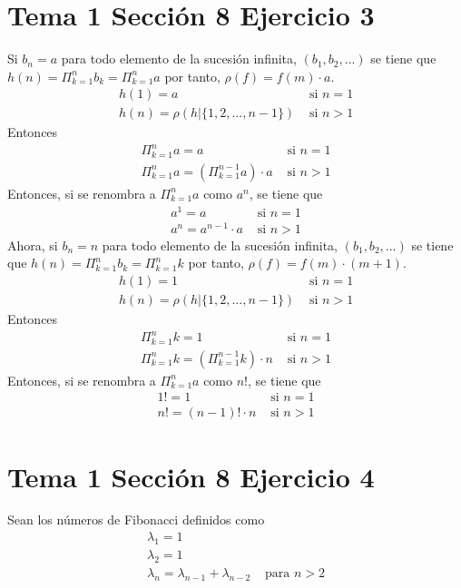 \documentclass{article}
\begin{document}
\section{Tema 1 Sección 8 Ejercicio 3}
Si $b_n=a$ para todo elemento de la sucesión infinita, $(b_1,b_2,...)$ se tiene que $h(n)=\Pi^n_{k=1}b_k=\Pi^n_{k=1}a$ por tanto, $\rho(f)= f(m)\cdot a$. 
\begin{eqnarray}
h(1)=a & \text{ si }n=1 \nonumber\\
h(n)=\rho(h|\{1,2,...,n-1\}) & \text{ si }n>1 \nonumber
\end{eqnarray}
Entonces 
\begin{eqnarray}
\Pi^n_{k=1}a=a & \text{ si }n=1 \nonumber\\
\Pi^n_{k=1}a=(\Pi^{n-1}_{k=1}a)\cdot a & \text{ si }n>1 \nonumber
\end{eqnarray}
Entonces, si se renombra a $\Pi^{n}_{k=1}a$ como $a^n$, se tiene que 
\begin{eqnarray}
a^1=a & \text{ si }n=1 \nonumber\\
a^n=a^{n-1}\cdot a  & \text{ si }n>1 \nonumber
\end{eqnarray}
Ahora, si $b_n=n$ para todo elemento de la sucesión infinita, $(b_1,b_2,...)$ se tiene que $h(n)=\Pi^n_{k=1}b_k=\Pi^n_{k=1}k$ por tanto, $\rho(f)= f(m)\cdot (m+1)$. 
\begin{eqnarray}
h(1)=1 & \text{ si }n=1 \nonumber\\
h(n)=\rho(h|\{1,2,...,n-1\}) & \text{ si }n>1 \nonumber
\end{eqnarray}
Entonces 
\begin{eqnarray}
\Pi^n_{k=1}k=1 & \text{ si }n=1 \nonumber\\
\Pi^n_{k=1}k=(\Pi^{n-1}_{k=1}k)\cdot n & \text{ si }n>1 \nonumber
\end{eqnarray}
Entonces, si se renombra a $\Pi^{n}_{k=1}a$ como $n!$, se tiene que 
\begin{eqnarray}
1!=1 & \text{ si }n=1 \nonumber\\
n!=(n-1)!\cdot n  & \text{ si }n>1 \nonumber
\end{eqnarray}
\section{Tema 1 Sección 8 Ejercicio 4}
Sean los números de Fibonacci definidos como
\begin{eqnarray}
\lambda_1=1 & \nonumber\\
\lambda_2=1 & \nonumber\\
\lambda_{n}=\lambda_{n-1}+\lambda_{n-2} & \text{ para }n>2\nonumber
\end{eqnarray}
\end{document}
